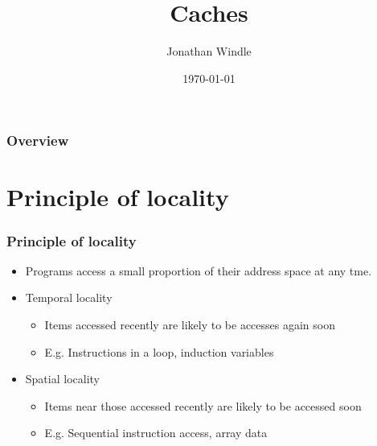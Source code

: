 \documentclass{beamer}
\title[Caches]{Caches} %
\author{Jonathan Windle} %
\institute[UEA] %
{
University of East Anglia \\ %
\medskip
\textit{J.Windle@uea.ac.uk} %
}
\date{\today} %
\begin{document}
\begin{frame}
\titlepage %
\end{frame}

\begin{frame}[allowframebreaks]
\frametitle{Overview} %
\tableofcontents %
\end{frame}

\section{Principle of locality}
\begin{frame}
\frametitle{Principle of locality}
\begin{itemize}
\item Programs access a small proportion of their address space at any tme.
\item {\color{red}Temporal locality}
\begin{itemize}
\item Items accessed recently are likely to be accesses again soon
\item E.g. Instructions in a loop, induction variables
\end{itemize}
\item {\color{green}Spatial locality}
\begin{itemize}
\item Items near those accessed recently are likely to be accessed soon
\item E.g. Sequential instruction access, array data
\end{itemize}
\end{itemize}
\end{frame}
\end{document}
